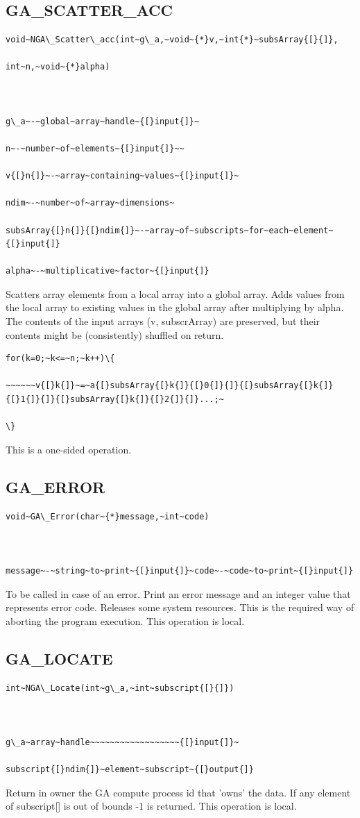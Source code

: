 \subsection*{\label{sub:GA_SCATTER_ACC}GA\_SCATTER\_ACC}
\begin{verbatim}
void~NGA\_Scatter\_acc(int~g\_a,~void~{*}v,~int{*}~subsArray{[}{]},

int~n,~void~{*}alpha)



g\_a~-~global~array~handle~{[}input{]}~

n~-~number~of~elements~{[}input{]}~~

v{[}n{]}~-~array~containing~values~{[}input{]}~

ndim~-~number~of~array~dimensions~

subsArray{[}n{]}{[}ndim{]}~-~array~of~subscripts~for~each~element~{[}input{]}

alpha~-~multiplicative~factor~{[}input{]}
\end{verbatim}
Scatters array elements from a local array into a global array. Adds
values from the local array to existing values in the global array
after multiplying by alpha. The contents of the input arrays (v, subscrArray)
are preserved, but their contents might be (consistently) shuffled
on return.
\begin{verbatim}
for(k=0;~k<=~n;~k++)\{

~~~~~~v{[}k{]}~=~a{[}subsArray{[}k{]}{[}0{]}{]}{[}subsArray{[}k{]}{[}1{]}{]}{[}subsArray{[}k{]}{[}2{]}{]}...;~

\}
\end{verbatim}
This is a one-sided operation.


\subsection*{\label{sub:GA_ERROR}GA\_ERROR}
\begin{verbatim}
void~GA\_Error(char~{*}message,~int~code)



message~-~string~to~print~{[}input{]}~code~-~code~to~print~{[}input{]}
\end{verbatim}
To be called in case of an error. Print an error message and an integer
value that represents error code. Releases some system resources.
This is the required way of aborting the program execution. This operation
is local. 


\subsection*{\label{sub:GA_LOCATE}GA\_LOCATE}
\begin{verbatim}
int~NGA\_Locate(int~g\_a,~int~subscript{[}{]})



g\_a~array~handle~~~~~~~~~~~~~~~~~~{[}input{]}~

subscript{[}ndim{]}~element~subscript~{[}output{]}
\end{verbatim}
Return in owner the GA compute process id that 'owns' the data. If
any element of subscript{[}{]} is out of bounds \textquotedbl{}-1\textquotedbl{}
is returned. This operation is local.


